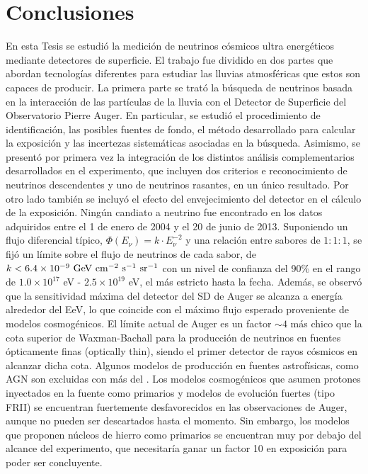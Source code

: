 \chapter{Conclusiones}
\label{ch:concl}

En esta Tesis se estudi\'o la medici\'on de neutrinos c\'osmicos ultra energ\'eticos mediante detectores de superficie. 
El trabajo fue dividido en dos partes que abordan tecnolog\'ias diferentes para estudiar las lluvias atmosf\'ericas que estos son capaces de producir.
La primera parte se trat\'o la b\'usqueda de neutrinos basada en la interacci\'on de las part\'iculas de la lluvia con el Detector de Superficie del Observatorio Pierre Auger.
En particular, se estudi\'o el procedimiento de identificaci\'on, las posibles fuentes de fondo, el m\'etodo desarrollado para calcular la exposici\'on y las incertezas sistem\'aticas asociadas en la b\'usqueda.
Asimismo, se present\'o por primera vez la integraci\'on de los distintos an\'alisis complementarios desarrollados en el experimento, que incluyen dos criterios e reconocimiento de neutrinos descendentes y uno de neutrinos rasantes, en un \'unico resultado.
Por otro lado tambi\'en se incluy\'o el efecto del envejecimiento del detector en el c\'alculo de la exposici\'on.
Ning\'un candiato a neutrino fue encontrado en los datos adquiridos entre el 1 de enero de 2004 y el 20 de junio de 2013. 
Suponiendo un flujo diferencial t\'ipico, $\Phi(E_\nu)= k\cdot E^{-2}_\nu$ y una relaci\'on entre sabores de $1 : 1 : 1$, se fij\'o un l\'imite sobre el flujo de neutrinos de cada sabor, de $k < 6.4 \times 10^{-9}~{\rm GeV~cm^{-2}~s^{-1}~sr^{-1}}$ con un nivel de confianza del 90\% en el rango de ${1.0 \times 10^{17}}$ {eV} - ${2.5 \times 10^{19}}$ {eV}, el m\'as estricto hasta la fecha.
Adem\'as, se observ\'o que la sensitividad m\'axima del detector del SD de Auger se alcanza a energ\'ia alrededor del EeV, lo que coincide con el m\'aximo flujo esperado proveniente de modelos cosmog\'enicos.
El l\'imite actual de Auger es un factor $\sim4$ m\'as chico que la cota superior de Waxman-Bachall para la producci\'on de neutrinos en fuentes \'opticamente finas (optically thin), siendo el primer detector de rayos c\'osmicos en alcanzar dicha cota.
Algunos modelos de producci\'on en fuentes astrof\'isicas, como AGN son excluidas con m\'as del .
Los modelos cosmog\'enicos que asumen protones inyectados en la fuente como primarios y modelos de evoluci\'on fuertes (tipo FRII) se encuentran fuertemente desfavorecidos en las observaciones de Auger, aunque no pueden ser descartados hasta el momento.
Sin embargo, los modelos que proponen n\'ucleos de hierro como primarios se encuentran muy por debajo del alcance del experimento, que necesitar\'ia ganar un factor 10 en exposici\'on para poder ser concluyente.

